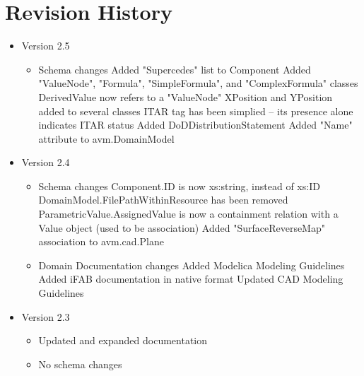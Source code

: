 \chapter{Revision History}
\begin{itemize}

\item{Version 2.5}
\begin{itemize}

\item Schema changes
\subitem Added "Supercedes" list to Component
\subitem Added "ValueNode", "Formula", "SimpleFormula", and "ComplexFormula" classes
\subitem DerivedValue now refers to a "ValueNode"
\subitem XPosition and YPosition added to several classes
\subitem ITAR tag has been simplied -- its presence alone indicates ITAR status
\subitem Added DoDDistributionStatement
\subitem Added "Name" attribute to avm.DomainModel
\end{itemize}

\end{itemize}

\begin{itemize}
\item{Version 2.4}

\begin{itemize}
\item Schema changes
\subitem Component.ID is now xs:string, instead of xs:ID
\subitem DomainModel.FilePathWithinResource has been removed
\subitem ParametricValue.AssignedValue is now a containment relation with a Value object (used to be association)
\subitem Added "SurfaceReverseMap" association to avm.cad.Plane
\item Domain Documentation changes
\subitem Added Modelica Modeling Guidelines
\subitem Added iFAB documentation in native format
\subitem Updated CAD Modeling Guidelines
\end{itemize}


\item{Version 2.3}

\begin{itemize}
\item Updated and expanded documentation
\item No schema changes
\end{itemize}

\end{itemize}

